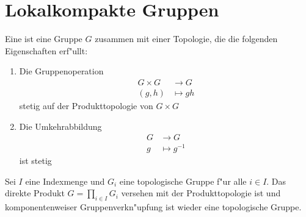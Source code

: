 \section{Lokalkompakte Gruppen}
\begin{defi}
	Eine  ist eine Gruppe $G$ zusammen mit einer Topologie, die die folgenden Eigenschaften erf"ullt:
		\begin{enumerate}[label=(\roman*), leftmargin=*, align=left, labelsep=1pt]
			\item Die Gruppenoperation
				\begin{align*}
					G \times G &\to G\\
					(g,h) &\mapsto gh
				\end{align*}
			stetig auf der Produkttopologie von $G \times G$
			\item Die Umkehrabbildung
				\begin{align*}
					G &\to G\\
					g &\mapsto g^{-1}
				\end{align*}
				ist stetig
		\end{enumerate}
	\end{defi}
	\begin{lemma}\label{lemma:direktesProduktTopologischerGruppen}
		Sei $I$ eine Indexmenge und $G_i$ eine topologische Gruppe f"ur alle $i \in I$. Das direkte Produkt $G = \prod_{i \in I} G_i$ versehen mit der Produkttopologie ist  und komponentenweiser Gruppenverkn"upfung ist wieder eine topologische Gruppe.
	\end{lemma}
